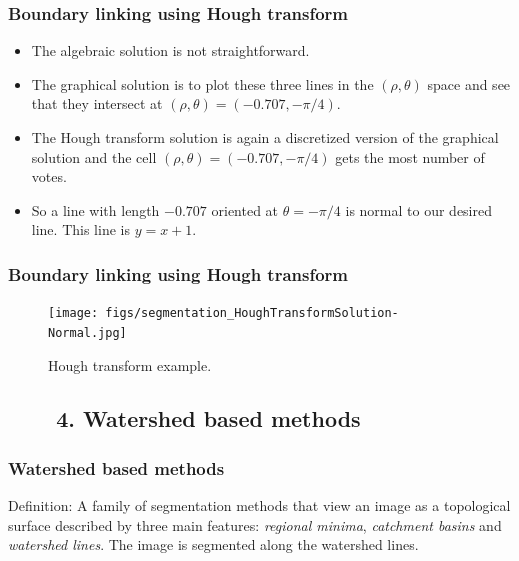 \begin{frame}
\frametitle{Boundary linking using Hough transform}
\logoCSIPCPL\mypagenum
	\begin{itemize}
		\item The algebraic solution is not straightforward.
		\item The graphical solution is to plot these three lines in the $(\rho, \theta)$ space and see that they intersect at $(\rho, \theta) = (-0.707, -\pi/4)$.
		\item The Hough transform solution is again a discretized version of the graphical solution and the cell $(\rho, \theta) = (-0.707, -\pi/4)$ gets the most number of votes.
		\item So a line with length $-0.707$ oriented at $\theta = -\pi/4$ is normal to our desired line. This line is $y=x+1$.
	\end{itemize}
\end{frame}







\begin{frame}
\frametitle{Boundary linking using Hough transform}
\logoCSIPCPL\mypagenum
	\begin{figure}[!htp]
		\texttt{[image: figs/segmentation\_HoughTransformSolution-Normal.jpg]}
		\caption{Hough transform example.} \label{fig:HoughTransformExample}
	\end{figure}
\end{frame}






\subsection{\ \ \ \ 4. Watershed based methods}


\begin{frame}
\frametitle{Watershed based methods}
\logoCSIPCPL\mypagenum
	\begin{block}{Definition:}
	A family of segmentation methods that view an image as a topological surface described by three main features: \emph{regional minima}, \emph{catchment basins} and \emph{watershed lines}.  The image is segmented along the watershed lines.
	\end{block}
\end{frame}





